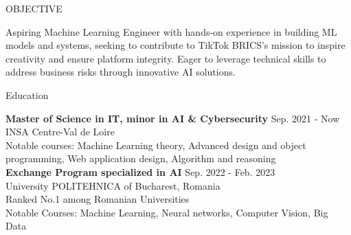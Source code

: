 \documentclass{resume} %
\begin{document}

\begin{rSection}{OBJECTIVE}

{Aspiring Machine Learning Engineer with hands-on experience in building ML models and systems, seeking to contribute to TikTok BRICS's mission to inspire creativity and ensure platform integrity. Eager to leverage technical skills to address business risks through innovative AI solutions.}

\end{rSection}


\begin{rSection}{Education}

{\bf Master of Science in IT, minor in AI \& Cybersecurity} \hfill {Sep. 2021 - Now}\\
INSA Centre-Val de Loire \\
Notable courses: Machine Learning theory, Advanced design and object programming, Web application design, Algorithm and reasoning \smallskip \\

{\bf Exchange Program specialized in AI} \hfill {Sep. 2022 - Feb. 2023}\\
University POLITEHNICA of Bucharest, Romania \\
Ranked No.1 among Romanian Universities \\
Notable Courses: Machine Learning, Neural networks, Computer Vision, Big Data

\end{rSection}
\end{document}

